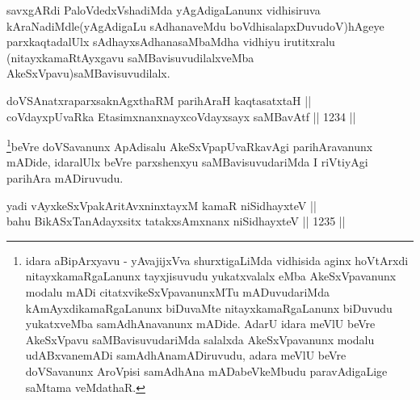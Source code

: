 \begin{artha}
savxgARdi PaloVdedxVshadiMda yAgAdigaLanunx vidhisiruva kAraNadiMdle(yAgAdigaLu sAdhanaveMdu boVdhisalapxDuvudoV)hAgeye parxkaqtadalUlx sAdhayxsAdhanasaMbaMdha vidhiyu irutitxralu (nitayxkamaRtAyxgavu saMBavisuvudilalxveMba AkeSxVpavu)saMBavisuvudilalx.
\end{artha}


\begin{shl}
doVSAnatxraparxsaknAgxthaRM parihAraH kaqtasatxtaH || \\
coVdayxpUvaRka EtasimxnanxnayxcoVdayxsayx saMBavAtf \hfill || 1234 ||   
\end{shl}

\begin{artha}
\footnote[1]{idara aBipArxyavu - yAvajijxVva shurxtigaLiMda vidhisida aginx hoVtArxdi nitayxkamaRgaLanunx tayxjisuvudu yukatxvalalx eMba AkeSxVpavanunx modalu mADi citatxvikeSxVpavanunxMTu mADuvudariMda kAmAyxdikamaRgaLanunx biDuvaMte nitayxkamaRgaLanunx biDuvudu yukatxveMba samAdhAnavanunx mADide. AdarU idara meVlU beVre AkeSxVpavu saMBavisuvudariMda salalxda AkeSxVpavanunx modalu udABxvanemADi samAdhAnamADiruvudu, adara meVlU beVre doVSavanunx AroVpisi samAdhAna mADabeVkeMbudu  paravAdigaLige saMtama veMdathaR.}beVre doVSavanunx ApAdisalu AkeSxVpapUvaRkavAgi parihAravanunx mADide, idaralUlx beVre parxshenxyu saMBavisuvudariMda I riVtiyAgi parihAra mADiruvudu.
\end{artha}


\begin{shl}
\footnotemark[2]yadi vAyxkeSxVpakAritAvxninxtayxM kamaR niSidhayxteV || \\
bahu BikASxTanAdayxsitx tatakxsAmxnanx niSidhayxteV \hfill || 1235 ||  
\end{shl}

